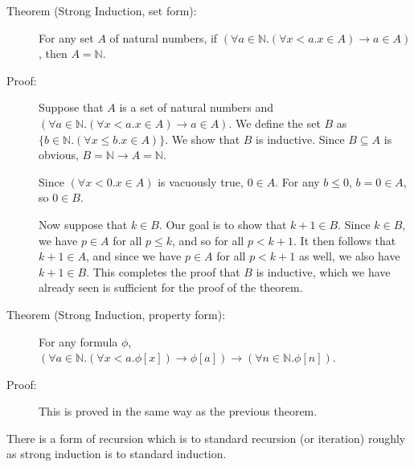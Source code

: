 \documentclass[12pt]{book}
\begin{document}
\begin{description}
\item[Theorem (Strong Induction, set form):] For any set $A$ of
natural numbers, if $(\forall a \in {\mathbb N}.(\forall x < a.x \in
A)\rightarrow a \in A)$, then $A={\mathbb N}$.

\item[Proof:] Suppose that $A$ is a set of natural numbers and
$(\forall a \in {\mathbb N}.(\forall x < a.x \in A)\rightarrow a \in
A)$.  We define the set $B$ as $\{b \in {\mathbb N}.(\forall x \leq
b.x \in A)\}$.  We show that $B$ is inductive.  Since $B \subseteq A$
is obvious, $B = {\mathbb N} \rightarrow A = {\mathbb N}$.

Since $(\forall x < 0.x \in A)$ is vacuously true, $0 \in A$.  For any
$b \leq 0$, $b=0\in A$, so $0 \in B$.

Now suppose that $k \in B$.  Our goal is to show that $k+1 \in B$.
Since $k \in B$, we have $p \in A$ for all $p \leq k$, and so for all
$p < k+1$.  It then follows that $k+1 \in A$, and since we have $p \in
A$ for all $p<k+1$ as well, we also have $k+1 \in B$.  This completes
the proof that $B$ is inductive, which we have already seen is
sufficient for the proof of the theorem.

\item[Theorem (Strong Induction, property form):] For any formula
$\phi$, $(\forall a \in {\mathbb N}.(\forall x <
a.\phi[x])\rightarrow \phi[a]) \rightarrow (\forall n \in {\mathbb
N}.\phi[n])$.

\item[Proof:] This is proved in the same way as the previous theorem.

\end{description}

There is a form of recursion which is to standard recursion (or
iteration) roughly as strong induction is to standard induction.
\end{document}
